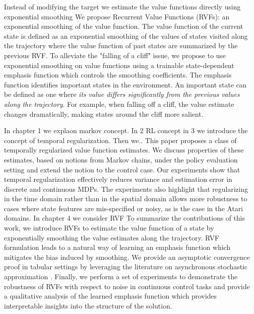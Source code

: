 Instead of modifying the target we estimate the value functions directly using exponential smoothing We propose Recurrent Value Functions (RVFs): an exponential smoothing of the value function. The value function of the current state is defined as an exponential smoothing of the values of states visited along the trajectory where the value function of past states are summarized by the previous RVF. To alleviate the "falling of a cliff" issue, we propose to use exponential smoothing on value functions using a trainable state-dependent emphasis function which controls the smoothing coefficients. The emphasis function identifies important states in the environment. An important state can be defined as one where \emph{its value differs significantly from the previous values along the trajectory}. For example, when falling off a cliff, the value estimate changes dramatically, making states around the cliff more salient.

In chapter 1 we explaon markov concept. In 2 RL concept in 3 we introduce the concept of temporal regularization. Then we..
This paper proposes a class of temporally regularized value function estimates. We discuss properties of these estimates, based on notions from Markov chains, under the policy evaluation setting and extend the notion to the control case. Our experiments show that temporal regularization effectively reduces variance and estimation error in discrete and continuous MDPs.  The experiments also highlight that regularizing in the time domain rather than in the spatial domain allows more robustness to cases where state features are mis-specified or noisy, as is the case in the Atari domains.
In chapter 4 we consider RVF
To summarize the contributions of this work, we introduce RVFs to estimate the value function of a state by exponentially smoothing the value estimates along the trajectory. RVF formulation leads to a natural way of learning an emphasis function which mitigates the bias induced by smoothing. We provide an asymptotic convergence proof in tabular settings by leveraging the literature on asynchronous stochastic approximation \citep{tsitsiklis1994asynchronous}. Finally, we perform a set of experiments to demonstrate the robustness of RVFs with respect to noise in continuous control tasks and provide a qualitative analysis of the learned emphasis function which provides interpretable insights into the structure of the solution.




